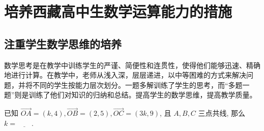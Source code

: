 \chapter{培养西藏高中生数学运算能力的措施}


\section{注重学生数学思维的培养}


数学思考是在教学中训练学生的严谨、简便性和连贯性，使得他们能够迅速、精确地进行计算。在教学中，老师从浅入深，层层递进，以中等困难的方式来解决问题，并将不同的学生按能力层次划分。一题多解训练了学生的思考，而“多题一题”则是训练了他们对知识的归纳和总结\cite{董安妮关于西藏高中生数学运算能力现状研究}。提高学生的数学思维，提高教学质量。

\begin{example}
  已知 $\overrightarrow{O A}=({k}, 4), \overrightarrow{O B}=(2,5), \overrightarrow{O C}=(3 {k}, 9)$, 且 ${A}, {B}, {C}$ 三点共线, 那么 ${k}= \underline{\hspace{2em}}$.
\end{example}

